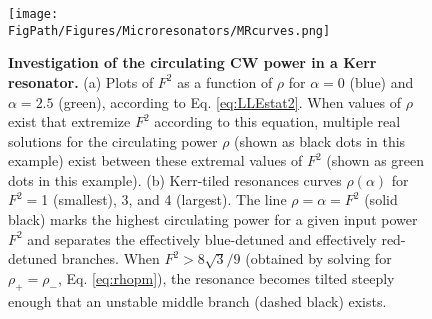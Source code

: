 \begin{figure}[htpb]
	\begin{center}
		\texttt{[image: \\FigPath/Figures/Microresonators/MRcurves.png]}
	\end{center}
	\caption[Investigation of the circulating CW power in a Kerr resonator]{\textbf{Investigation of the circulating CW power in a Kerr resonator.} (a) Plots of $F^2$ as a function of $\rho$ for $\alpha=0$ (blue) and $\alpha=2.5$ (green), according to Eq. \ref{eq:LLEstat2}. When values of $\rho$ exist that extremize $F^2$ according to this equation, multiple real solutions for the circulating power $\rho$ (shown as black dots in this example) exist between these extremal values of $F^2$ (shown as green dots in this example). (b) Kerr-tiled resonances curves $\rho(\alpha)$ for $F^2=$1 (smallest), 3, and 4 (largest). The line $\rho=\alpha=F^2$ (solid black) marks the highest circulating power for a given input power $F^2$ and separates the effectively blue-detuned and effectively red-detuned branches. When $F^2>8\sqrt{3}/9$ (obtained by solving for $\rho_+=\rho_-$, Eq. \ref{eq:rhopm}), the resonance becomes tilted steeply enough that an unstable middle branch (dashed black) exists. }
	
	\label{fig:MRcurves}
\end{figure} 

